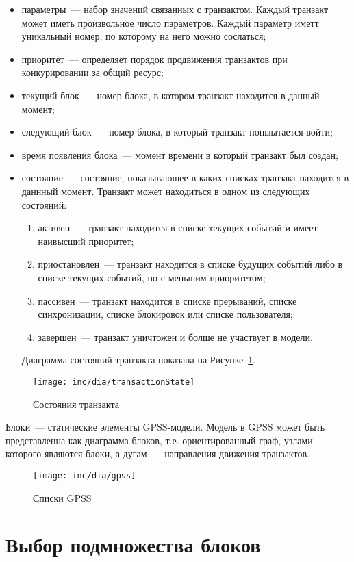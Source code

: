\begin{itemize}
\item параметры~--- набор значений связанных с транзактом. Каждый транзакт может иметь произвольное число параметров. Каждый параметр иметт уникальный номер, по которому на него можно сослаться;
\item приоритет~--- определяет порядок продвижения транзактов при конкурировании за общий ресурс;
\item текущий блок~--- номер блока, в котором транзакт находится в данный момент;
\item следующий блок~--- номер блока, в который транзакт попыытается войти;
\item время появления блока~---  момент времени в который транзакт был создан;
\item состояние~--- состояние, показывающее в каких списках транзакт находится в даннный момент. Транзакт может находиться в одном из следующих состояний:
    \begin{enumerate}
    \item активен~--- транзакт находится в списке текущих событий и имеет наивысший приоритет;
    \item приостановлен~--- транзакт находится в списке будущих событий либо в списке текущих событий, но с меньшим приоритетом;
    \item пассивен~--- транзакт находится в списке прерываний, списке синхронизации, списке блокировок или списке пользователя;
    \item завершен~--- транзакт уничтожен и болше не участвует в модели.
    \end{enumerate}
    Диаграмма состояний транзакта показана на Рисунке~\ref{fig:transactionState}.
\end{itemize}


\begin{figure}[ht]
  \centering
  \texttt{[image: inc/dia/transactionState]}
  \caption{Состояния транзакта}
  \label{fig:transactionState}
\end{figure}


Блоки~--- статические элементы GPSS-модели. Модель в GPSS может быть представленна как диаграмма блоков, т.е. ориентированный граф, узлами которого являются блоки, а дугам~--- направления движения транзактов.

\begin{figure}[ht]
  \centering
  \texttt{[image: inc/dia/gpss]}
  \caption{Списки GPSS}
  \label{fig:GPSSChains}
\end{figure}



\section{Выбор подмножества блоков}


